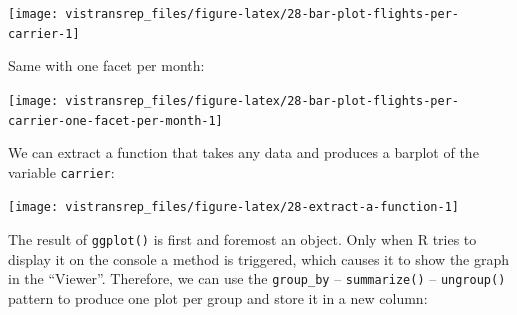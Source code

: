\documentclass[]{book}
\newenvironment{Shaded}{}{}
\newcommand{\ControlFlowTok}[1]{\textcolor[rgb]{0.00,0.00,1.00}{#1}}
\newcommand{\DataTypeTok}[1]{#1}
\newcommand{\KeywordTok}[1]{\textcolor[rgb]{0.00,0.00,1.00}{#1}}
\newcommand{\NormalTok}[1]{#1}
\newcommand{\OperatorTok}[1]{#1}
\newcommand{\StringTok}[1]{\textcolor[rgb]{0.00,0.50,0.50}{#1}}
\begin{document}
\begin{flushright}\texttt{[image: vistransrep\_files/figure-latex/28-bar-plot-flights-per-carrier-1]} \end{flushright}

Same with one facet per month:

\begin{Shaded}
\end{Shaded}

\begin{flushright}\texttt{[image: vistransrep\_files/figure-latex/28-bar-plot-flights-per-carrier-one-facet-per-month-1]} \end{flushright}

We can extract a function that takes any data and produces a barplot of the variable \texttt{carrier}:

\begin{Shaded}
\end{Shaded}

\begin{flushright}\texttt{[image: vistransrep\_files/figure-latex/28-extract-a-function-1]} \end{flushright}

The result of \texttt{ggplot()} is first and foremost an object.
Only when R tries to display it on the console a method is triggered, which causes it to show the graph in the ``Viewer''.
Therefore, we can use the \texttt{group\_by} -- \texttt{summarize()} -- \texttt{ungroup()} pattern to produce one plot per group and store it in a new column:

\begin{Shaded}
\end{Shaded}
\end{document}
